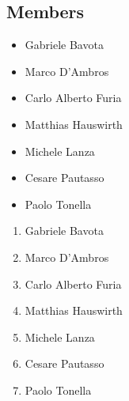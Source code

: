 \subsection{Members}

\begin{itemize}

    \item Gabriele Bavota
    \item Marco D'Ambros
    \item Carlo Alberto Furia
    \item Matthias Hauswirth
    \item Michele Lanza
    \item Cesare Pautasso
    \item Paolo Tonella

\end{itemize}

\begin{enumerate}

    \item Gabriele Bavota
    \item Marco D'Ambros
    \item Carlo Alberto Furia
    \item Matthias Hauswirth
    \item Michele Lanza \cite{Lanz2006a}
    \item Cesare Pautasso
    \item Paolo Tonella

\end{enumerate}